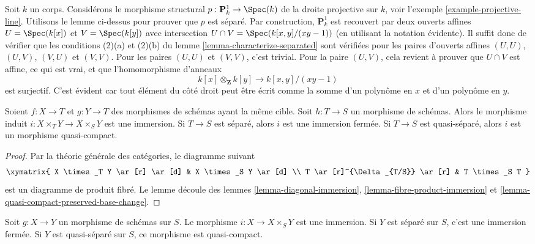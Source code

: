 \begin{example}
\label{example-projective-line-separated}
Soit $k$ un corps. Considérons le morphisme structural $p
: \mathbf{P}^1_k \to \Spec(k)$ de la droite projective
sur $k$, voir l'exemple \ref{example-projective-line}. Utilisons
le lemme ci-dessus pour prouver que $p$ est
séparé. Par construction, $\mathbf{P}^1_k$ est recouvert par deux ouverts
affines $U = \Spec(k[x])$ et $V = \Spec(k[y])$ avec
intersection $U \cap V = \Spec(k[x, y]/(xy - 1))$ (en utilisant
la notation évidente). Il suffit donc de vérifier que les
conditions (2)(a) et (2)(b) du lemme \ref{lemma-characterize-separated} sont
vérifiées pour les paires d'ouverts affines $(U, U)$, $(U, V)$, $(V, U)$
et $(V, V)$. Pour les paires $(U, U)$ et $(V, V)$, c'est trivial. Pour
la paire $(U, V)$, cela revient à prouver que $U
\cap V$ est affine, ce qui est vrai, et que l'homomorphisme d'anneaux
$$
k[x] \otimes_{\mathbf{Z}} k[y] \longrightarrow k[x, y]/(xy - 1)
$$
est surjectif. C'est évident car tout élément du côté
droit peut être écrit comme la somme d'un polynôme en
$x$ et d'un polynôme en $y$.
\end{example}

\begin{lemma}
\label{lemma-fibre-product-after-map}
Soient $f : X \to T$ et $g : Y \to T$ des morphismes de schémas
ayant la même cible. Soit $h : T \to S$ un morphisme de schémas.
Alors le morphisme induit $i : X \times_T Y \to X \times_S Y$ est
une immersion. Si $T \to S$ est séparé, alors $i$ est une immersion
fermée. Si $T \to S$ est quasi-séparé, alors $i$ est un
morphisme quasi-compact.
\end{lemma}

\begin{proof}
Par la théorie générale des catégories, le diagramme suivant
$$
\xymatrix{
X \times_T Y \ar[r] \ar[d] & X \times_S Y \ar[d] \\
T \ar[r]^{\Delta_{T/S}} \ar[r] & T \times_S T
}
$$
est un diagramme de produit fibré. Le lemme
découle des lemmes \ref{lemma-diagonal-immersion},
\ref{lemma-fibre-product-immersion} et
\ref{lemma-quasi-compact-preserved-base-change}.
\end{proof}

\begin{lemma}
\label{lemma-semi-diagonal}
Soit $g : X \to Y$ un morphisme de schémas sur $S$. Le
morphisme $i : X \to X \times_S Y$ est une immersion.
Si $Y$ est séparé sur $S$, c'est une immersion fermée.
Si $Y$ est quasi-séparé sur $S$, ce morphisme est quasi-compact.
\end{lemma}

